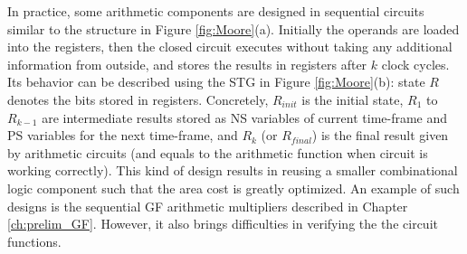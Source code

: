 \begin{figure}[H]
\end{figure}

In practice,
some arithmetic components are designed in sequential circuits similar to the structure in 
Figure \ref{fig:Moore}(a). Initially the operands are loaded into the registers, 
then the closed circuit executes without taking any additional information from outside,
and stores the results in registers after $k$ clock cycles. Its behavior can be described using the 
STG in Figure \ref{fig:Moore}(b): state $R$ denotes the bits stored in registers. Concretely, 
$R_{init}$ is the initial state, $R_1$ to $R_{k-1}$ are intermediate results stored as NS variables 
of current time-frame and PS variables for the next time-frame, and $R_k$ (or $R_{final}$) 
is the final result given by arithmetic circuits (and equals to the
arithmetic function when circuit is working correctly).
This kind of design results in 
reusing a smaller combinational logic component such that the area cost is greatly optimized.
An example of such designs is the sequential GF arithmetic multipliers described in Chapter \ref{ch:prelim_GF}.
However, it also brings difficulties in verifying the the circuit functions.

\begin{figure}[H]
\end{figure}

